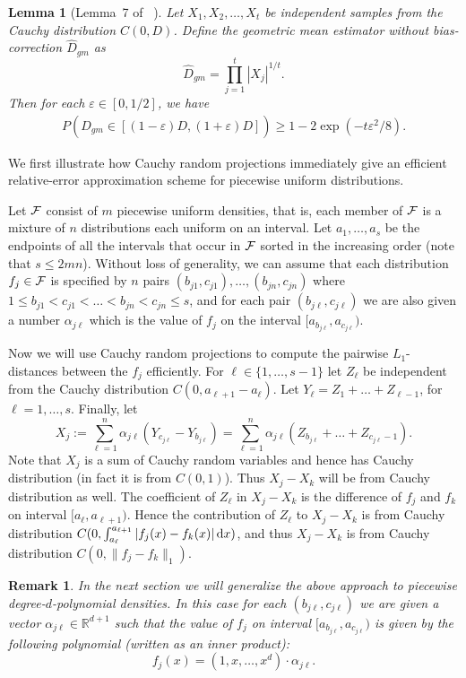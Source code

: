 \documentclass[11pt]{article}
\def\eps{\varepsilon}
\def\R{{\mathbb R}}
\def\({\left(} \def\){\right)} \def\hatU{\widehat{U}}
\newtheorem{rem}[thm]{Remark}
\newtheorem{lem}[thm]{Lemma}
\def\BLEM{\begin{lem}}
\def\ELEM{\end{lem}}
\def\BREM{\begin{rem}\rm}
\def\EREM{\end{rem}}
\begin{document}
\BLEM[Lemma~7 of ~\cite{LHC07}]\label{l:lhctail}
Let $X_1, X_2, \ldots, X_t$ be independent samples from the Cauchy distribution $C(0,D)$.
Define the geometric mean estimator without bias-correction $\hat{D}_{gm}$ as
\[ \hat{D}_{gm} = \prod_{j=1}^{t} |X_j|^{1/t}.\]
Then for each $\eps\in [0,1/2]$, we have
\begin{eqnarray*}
P\(\hat{D}_{gm} \in [ (1-\eps)D, (1+\eps)D ] \) \geq 1 - 2\exp(-t\eps^2/8).
\end{eqnarray*}
\ELEM

We first illustrate how Cauchy random projections immediately give an efficient relative-error approximation
scheme for piecewise uniform distributions.

Let ${\cal F}$ consist of $m$ piecewise uniform densities, that is, each member of ${\cal F}$ is
a mixture of $n$ distributions each uniform on an interval. Let $a_1,\dots,a_{s}$ be the
endpoints of all the intervals that occur in ${\cal F}$ sorted in the increasing order
(note that $s\leq 2mn$). Without loss of generality, we can assume that
each distribution $f_j\in {\cal F}$ is specified by $n$ pairs
$(b_{j1},c_{j1}),\dots,(b_{jn},c_{jn})$ where
$1\leq b_{j1}<c_{j1}<\dots<b_{jn}<c_{jn}\leq s$,
and for each pair $(b_{j\ell},c_{j\ell})$ we are also given
a number $\alpha_{j\ell}$ which is the value of $f_j$ on
the interval $[a_{b_{j\ell}},a_{c_{j\ell}})$.

Now we will use Cauchy random projections to compute the pairwise $L_1$-distances between the $f_j$
efficiently. For $\ell\in\{1,\dots,s-1\}$ let $Z_\ell$ be independent from the
Cauchy distribution $C(0,a_{\ell+1}-a_\ell)$. Let $Y_{\ell}=Z_1+\dots+Z_{\ell-1}$, for $\ell=1,\dots,s$.
Finally, let
\begin{equation}\label{stint}
X_j:=\sum_{\ell=1}^n \alpha_{j\ell} (Y_{c_{j\ell}} - Y_{b_{j\ell}})=\sum_{\ell=1}^n\alpha_{j\ell}
(Z_{b_{j\ell}}+\dots+Z_{c_{j\ell}-1}).
\end{equation}
Note that $X_j$ is a sum of Cauchy random variables and hence has Cauchy distribution (in fact it
is from $C(0,1)$). Thus $X_j-X_k$ will be from Cauchy distribution as well. The coefficient of
$Z_\ell$ in $X_j-X_k$ is the difference of $f_j$ and $f_k$ on interval $[a_\ell,a_{\ell+1})$.
Hence the contribution of $Z_{\ell}$ to $X_j-X_k$ is from Cauchy distribution
$C(0,\int_{a_{\ell}}^{a_{\ell+1}} |f_j(x)-f_k(x)|\,{\rm d}x)$, and thus
$X_j-X_k$ is from Cauchy distribution $C(0,\|f_j-f_k\|_1)$.

\BREM\label{det}
In the next section we will generalize the above approach to piecewise degree-$d$-polynomial
densities. In this case for each $(b_{j\ell},c_{j\ell})$ we are given a vector
$\alpha_{j\ell}\in\R^{d+1}$ such that the value of $f_j$ on interval $[a_{b_{j\ell}},a_{c_{j\ell}})$
is given by the following polynomial (written as an inner product):
$$
f_j(x)=(1,x,\dots,x^d)\cdot \alpha_{j\ell}.
$$
\EREM
\end{document}
